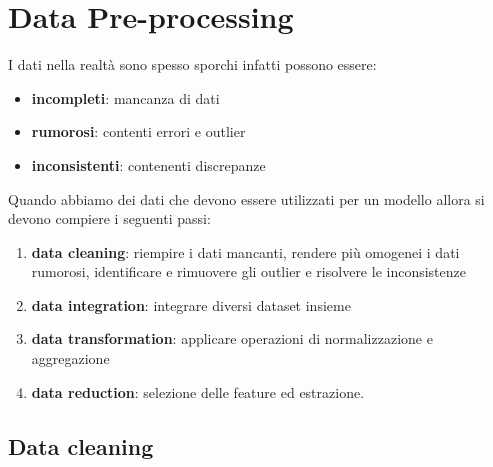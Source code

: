 \chapter{Data Pre-processing}
I dati nella realtà sono spesso sporchi infatti possono essere:
\begin{itemize}
    \item \textbf{incompleti}: mancanza di dati
    \item \textbf{rumorosi}: contenti errori e outlier
    \item \textbf{inconsistenti}: contenenti discrepanze 
\end{itemize}

Quando abbiamo dei dati che devono essere utilizzati per un modello allora si 
devono compiere i seguenti passi:
\begin{enumerate}
    \item \textbf{data cleaning}: riempire i dati mancanti, rendere più omogenei
    i dati rumorosi, identificare e rimuovere gli outlier e risolvere le inconsistenze
    \item \textbf{data integration}: integrare diversi dataset insieme
    \item \textbf{data transformation}: applicare operazioni di normalizzazione e aggregazione
    \item \textbf{data reduction}: selezione delle feature ed estrazione.
\end{enumerate}


\section{Data cleaning}
